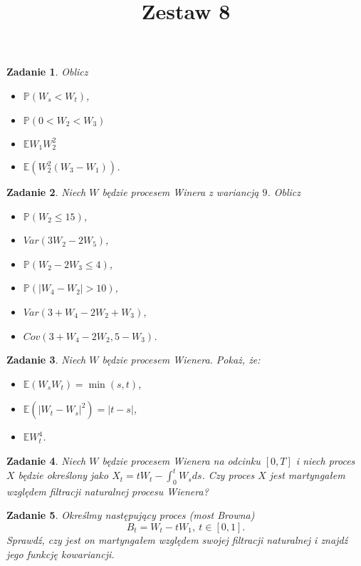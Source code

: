 \documentclass{mwart}
\title{Zestaw 8}
\newtheorem{zd}{Zadanie}
\begin{document}

\maketitle

\begin{zd}
	Oblicz
	\begin{itemize}
		\item $\mathbb{P}(W_s < W_t)$,
		\item $\mathbb{P}(0 < W_2 < W_3)$
		\item $\mathbb{E}W_1W_2^2$
		\item $\mathbb{E}\left(W_2^2(W_3 - W_1)\right)$.
	\end{itemize}
\end{zd}

\begin{zd}
Niech $W$ będzie procesem Winera z wariancją $9$. Oblicz
\begin{itemize}
\item $\mathbb{P}(W_2 \leq 15)$,
\item $Var(3W_2-2W_5)$,
\item $\mathbb{P}(W_2-2W_3\leq 4)$,
\item $\mathbb{P}(|W_4-W_2|> 10)$,
\item $Var(3+W_4-2W_2+W_3)$,
\item $Cov(3+W_4-2W_2, 5-W_3)$.
\end{itemize}
\end{zd}

\begin{zd}
Niech $W$ będzie procesem Wienera. Pokaż, że:
\begin{itemize}
\item $\mathbb{E}(W_sW_t) = \min(s, t)$,
\item $\mathbb{E}(|W_t-W_s|^2) = |t-s|$,
\item $\mathbb{E}W_t^4$.
\end{itemize}
\end{zd}

\begin{zd}
Niech $W$ będzie procesem Wienera na odcinku $[0, T]$ i niech proces $X$ będzie określony jako $X_t = tW_t - \int_0^tW_sds$. Czy proces $X$ jest martyngałem względem filtracji naturalnej procesu Wienera?
\end{zd}

\begin{zd}
	Określmy następujący proces (most Browna)
	\begin{displaymath}
		B_t = W_t - tW_1, \ t\in[0,1].
	\end{displaymath}
	Sprawdź, czy jest on martyngałem względem swojej filtracji naturalnej i znajdź jego funkcję kowariancji.
\end{zd}
\end{document}
